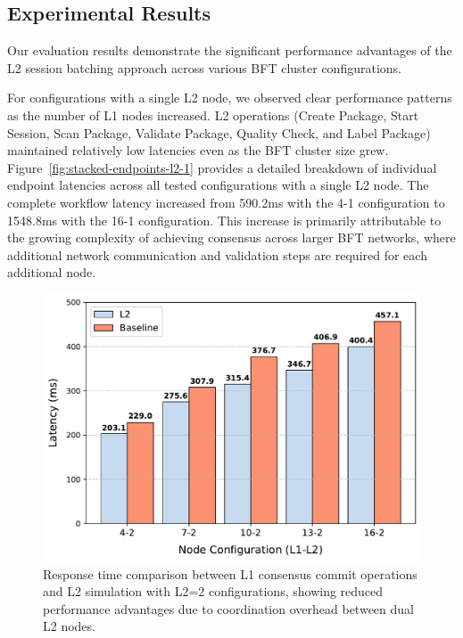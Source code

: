 \documentclass[conference]{IEEEtran}
\begin{document}

\subsection{Experimental Results}

Our evaluation results demonstrate the significant performance advantages of the L2 session batching approach across various BFT cluster configurations.

For configurations with a single L2 node, we observed clear performance patterns as the number of L1 nodes increased. L2 operations (Create Package, Start Session, Scan Package, Validate Package, Quality Check, and Label Package) maintained relatively low latencies even as the BFT cluster size grew. Figure~\ref{fig:stacked-endpoints-l2-1} provides a detailed breakdown of individual endpoint latencies across all tested configurations with a single L2 node. The complete workflow latency increased from 590.2ms with the 4-1 configuration to 1548.8ms with the 16-1 configuration. This increase is primarily attributable to the growing complexity of achieving consensus across larger BFT networks, where additional network communication and validation steps are required for each additional node.

\begin{figure}[t]
    \centering
    \includegraphics[width=1\linewidth]{figure/l1_vs_l2_comparison_l2_2.pdf}
    \caption{Response time comparison between L1 consensus commit operations and L2 simulation with L2=2 configurations, showing reduced performance advantages due to coordination overhead between dual L2 nodes.}
    \label{fig:baseline-comparison-l2-2}
\end{figure}
\end{document}
